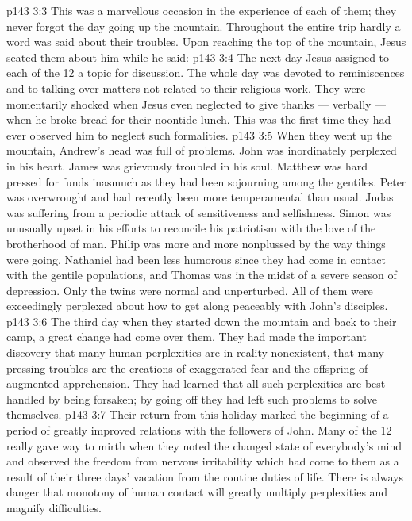 \vs p143 3:3 \pc This was a marvellous occasion in the experience of each of them; they never forgot the day going up the mountain. Throughout the entire trip hardly a word was said about their troubles. Upon reaching the top of the mountain, Jesus seated them about him while he said: 
\vs p143 3:4 The next day Jesus assigned to each of the 12 a topic for discussion. The whole day was devoted to reminiscences and to talking over matters not related to their religious work. They were momentarily shocked when Jesus even neglected to give thanks --- verbally --- when he broke bread for their noontide lunch. This was the first time they had ever observed him to neglect such formalities.
\vs p143 3:5 When they went up the mountain, Andrew’s head was full of problems. John was inordinately perplexed in his heart. James was grievously troubled in his soul. Matthew was hard pressed for funds inasmuch as they had been sojourning among the gentiles. Peter was overwrought and had recently been more temperamental than usual. Judas was suffering from a periodic attack of sensitiveness and selfishness. Simon was unusually upset in his efforts to reconcile his patriotism with the love of the brotherhood of man. Philip was more and more nonplussed by the way things were going. Nathaniel had been less humorous since they had come in contact with the gentile populations, and Thomas was in the midst of a severe season of depression. Only the twins were normal and unperturbed. All of them were exceedingly perplexed about how to get along peaceably with John’s disciples.
\vs p143 3:6 The third day when they started down the mountain and back to their camp, a great change had come over them. They had made the important discovery that many human perplexities are in reality nonexistent, that many pressing troubles are the creations of exaggerated fear and the offspring of augmented apprehension. They had learned that all such perplexities are best handled by being forsaken; by going off they had left such problems to solve themselves.
\vs p143 3:7 Their return from this holiday marked the beginning of a period of greatly improved relations with the followers of John. Many of the 12 really gave way to mirth when they noted the changed state of everybody’s mind and observed the freedom from nervous irritability which had come to them as a result of their three days’ vacation from the routine duties of life. There is always danger that monotony of human contact will greatly multiply perplexities and magnify difficulties.
